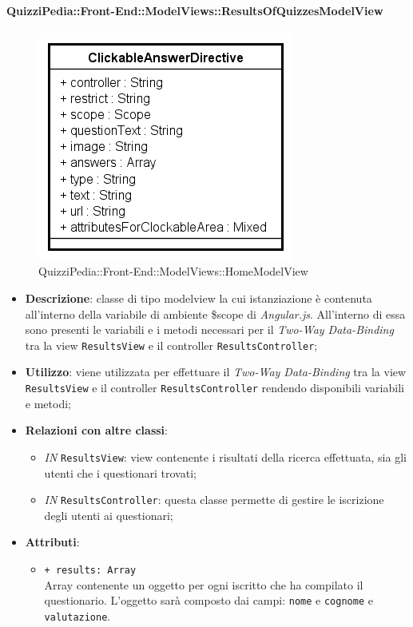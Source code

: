 	\paragraph{QuizziPedia::Front-End::ModelViews::ResultsOfQuizzesModelView}
	
	\label{QuizziPedia::Front-End::ModelViews::ResultsOfQuizzesModelView}
	
	\begin{figure}[ht]
		\centering
		\includegraphics[scale=0.5,keepaspectratio]{UML/Classi/Front-End/QuizziPedia_Front-end_Templates_ClickableAnswerTemplate.png}
		\caption{QuizziPedia::Front-End::ModelViews::HomeModelView}
	\end{figure} \FloatBarrier
	
	\begin{itemize}
		\item \textbf{Descrizione}: classe di tipo modelview la cui istanziazione è contenuta all'interno della variabile di ambiente \$scope di \textit{Angular.js}. All'interno di essa sono presenti le variabili e i metodi necessari per il \textit{Two-Way Data-Binding} tra la view \texttt{ResultsView} e il controller \texttt{ResultsController};
		\item \textbf{Utilizzo}: viene utilizzata per effettuare il \textit{Two-Way Data-Binding} tra la view \texttt{ResultsView} e il controller \texttt{ResultsController} rendendo disponibili variabili e metodi;
		\item \textbf{Relazioni con altre classi}: 
		\begin{itemize}
			\item \textit{IN} \texttt{ResultsView}: view contenente i risultati della ricerca effettuata, sia gli utenti che i questionari trovati; 
			\item \textit{IN} \texttt{ResultsController}: questa classe permette di gestire le iscrizione degli utenti ai questionari;
		\end{itemize}
		\item \textbf{Attributi}: 
		\begin{itemize}
			\item \texttt{+ results: Array} \\ Array contenente un oggetto per ogni iscritto che ha compilato il questionario. L'oggetto sarà composto dai campi: \texttt{nome} e \texttt{cognome} e \texttt{valutazione}.
		\end{itemize}
	\end{itemize}
	
